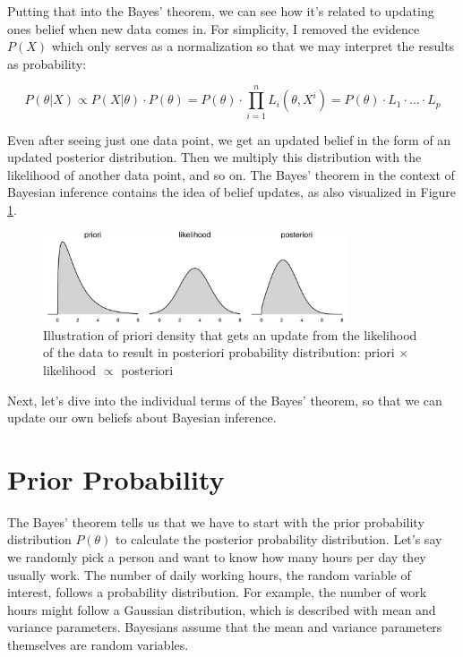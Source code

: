 \documentclass[
  10pt,
]{scrbook}
\begin{document}
Putting that into the Bayes' theorem, we can see how it's related to updating ones belief when new data comes in.
For simplicity, I removed the evidence \(P(X)\) which only serves as a normalization so that we may interpret the results as probability:

\[P(\theta|X) \propto P(X | \theta) \cdot  P(\theta) = P(\theta) \cdot \prod_{i=1}^n L_i(\theta, X^{i}) = P(\theta) \cdot L_1 \cdot \ldots \cdot L_p\]

Even after seeing just one data point, we get an updated belief in the form of an updated posterior distribution.
Then we multiply this distribution with the likelihood of another data point, and so on.
The Bayes' theorem in the context of Bayesian inference contains the idea of belief updates, as also visualized in Figure \ref{fig:bayesian}.

\begin{figure}

{\centering \includegraphics[width=0.8\textwidth]{figures/bayesian-1} 

}

\caption{Illustration of priori density that gets an update from the likelihood of the data to result in posteriori probability distribution: priori $\times$ likelihood $\propto$ posteriori}\label{fig:bayesian}
\end{figure}

Next, let's dive into the individual terms of the Bayes' theorem, so that we can update our own beliefs about Bayesian inference.

\hypertarget{prior-probability}{%
\section{Prior Probability}\label{prior-probability}}

The Bayes' theorem tells us that we have to start with the prior probability distribution \(P(\theta)\) to calculate the posterior probability distribution.
Let's say we randomly pick a person and want to know how many hours per day they usually work.
The number of daily working hours, the random variable of interest, follows a probability distribution.
For example, the number of work hours might follow a Gaussian distribution, which is described with mean and variance parameters.
Bayesians assume that the mean and variance parameters themselves are random variables.
\end{document}
